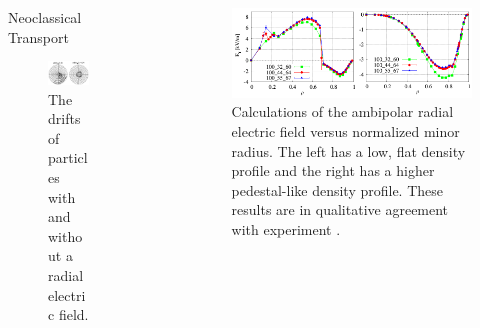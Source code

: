 \documentclass{beamer}
\newlength{\sepwidsingle}
\newlength{\onecolwid}
\begin{document}
\begin{frame}[t]
\begin{columns}[t]
\begin{column}{\onecolwid}
\begin{block}{Neoclassical Transport}
\begin{figure}
	\includegraphics[width=0.7\linewidth]{../Graphics/Drifts.png}
	\caption{The drifts of particles with and without a radial electric field.}
	\label{fig:drifts}
\end{figure}

\end{block}

\end{column}


\begin{column}{\sepwidsingle}\end{column}
\vrule
\begin{column}{\sepwidsingle}\end{column}


\begin{column}{\onecolwid}

\begin{figure}
	\includegraphics[trim={0 0.5cm 0 0.5cm}, clip, width=1.0\linewidth]{../Graphics/Radial_field.png}
	\caption{Calculations of the ambipolar radial electric field versus normalized minor radius. The left has a low, flat density profile and the right has a higher pedestal-like density profile. These results are in qualitative agreement with experiment \cite{velasco_study_2012}.}
	\label{fig:radial_field}
\end{figure}


\end{column}
\end{columns}
\end{frame}
\end{document}
